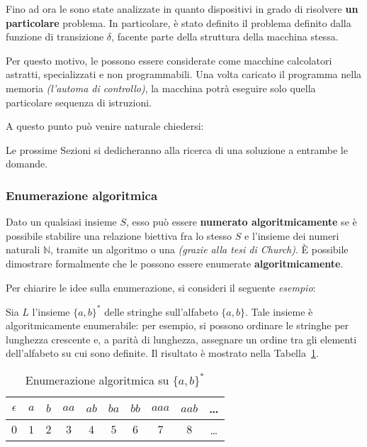 \documentclass[italian, 10pt]{article}
\begin{document}
Fino ad ora le \TM sono state analizzate in quanto dispositivi in grado di risolvere \textbf{un particolare} problema.
In particolare, è stato definito il problema definito dalla funzione di transizione \(\delta\), facente parte della struttura della macchina stessa.

Per questo motivo, le \TM possono essere considerate come macchine calcolatori astratti, specializzati e non programmabili.
Una volta caricato il programma nella memoria \textit{(l'automa di controllo)}, la macchina potrà eseguire solo quella particolare sequenza di istruzioni.

A questo punto può venire naturale chiedersi:


Le prossime Sezioni si dedicheranno alla ricerca di una soluzione a entrambe le domande.

\subsubsection{Enumerazione algoritmica}
\label{sec:enumerazione-algoritmica}

Dato un qualsiasi insieme \(S\), esso può essere \textbf{numerato algoritmicamente} se è possibile stabilire una relazione biettiva fra lo stesso \(S\) e l'insieme dei numeri naturali \(\mathbb{N}\), tramite un algoritmo o una \TM \textit{(grazie alla tesi di Church)}.
È possibile dimostrare formalmente che le \TM possono essere enumerate \textbf{algoritmicamente}.

\bigskip
Per chiarire le idee sulla enumerazione, si consideri il seguente \textit{esempio}:

Sia \(L\) l'insieme \(\{a, b\}^\ast\) delle stringhe sull'alfabeto \(\{a, b\}\).
Tale insieme è algoritmicamente enumerabile: per esempio, si possono ordinare le stringhe per lunghezza crescente e, a parità di lunghezza, assegnare un ordine tra gli elementi dell'alfabeto su cui sono definite.
Il risultato è mostrato nella Tabella~\ref{tab:enumerazione-algoritmica}.

\begin{table}[htbp]
  \bigskip
  \centering
  \begin{tabular}{c|c|c|c|c|c|c|c|c|c}
    \(\epsilon\) & \(a\) & \(b\) & \(aa\) & \(ab\) & \(ba\) & \(bb\) & \(aaa\) & \(aab\) & \dots \\ \hline
    \(0\)        & \(1\) & \(2\) & \(3\)  & \(4\)  & \(5\)  & \(6\)  & \(7\)   & \(8\)   & \dots
  \end{tabular}
  \bigskip
  \caption{Enumerazione algoritmica su \(\{a, b\}^\ast\)}
  \label{tab:enumerazione-algoritmica}
\end{table}
\end{document}
